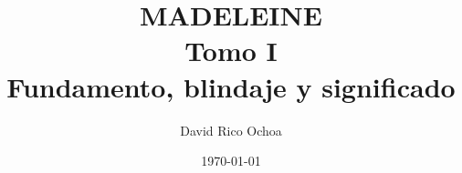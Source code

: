 \documentclass[11pt,oneside]{book}
\begin{document}
\frontmatter
\title{MADELEINE \\ Tomo I \\ Fundamento, blindaje y significado}
\author{David Rico Ochoa}
\date{\today}
\maketitle
\tableofcontents
\mainmatter















\end{document}
